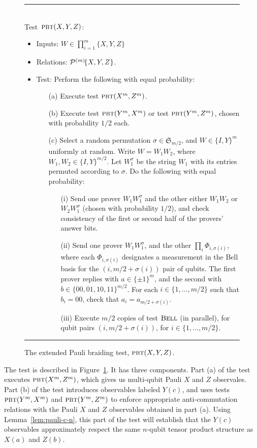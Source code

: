 \begin{figure}[H]
\rule[1ex]{16.5cm}{0.5pt}\\
\justifying
Test~$\textsc{pbt}(X,Y,Z)$: 
\begin{itemize}
\item Inputs: $W\in\prod_{i=1}^m\{X,Y,Z\}$
\item Relations: $\mathcal{P}^{(m)}\!\{X,Y,Z\}$.  
\item Test: Perform the following with equal probability: 
\begin{enumerate}
\item[(a)] Execute test $\textsc{pbt}(X^m,Z^m)$. 
\item[(b)] Execute test $\textsc{pbt}(Y^m,X^m)$ or test $\textsc{pbt}(Y^m,Z^m)$, chosen with probability $1/2$ each.
\item[(c)] Select a random permutation  $\sigma \in \mathfrak{S}_{m/2}$, and $W\in  \{I,Y\}^m$ uniformly at random. Write $W=W_1 W_2$, where $W_1,W_2\in \{I,Y\}^{m/2}$. Let $W_1^\sigma$ be the string $W_1$ with its entries permuted according to $\sigma$. Do the following with equal probability: 
\begin{enumerate}
\item[(i)] Send one prover $W_1 W_1^\sigma$ and the other either $W_1 W_2$ or $W_2W_1^\sigma$ (chosen with probability $1/2$), and check consistency of the first or second half of the provers' answer bits.
\item[(ii)] Send one prover $W_1  W_1^\sigma$, and the other $\prod_i \Phi_{i,\sigma(i)}$, where each $\Phi_{i,\sigma(i)}$ designates a measurement in the Bell basis for the $(i,m/2+\sigma(i))$ pair of qubits. 
    The first prover replies with $a\in\{\pm 1 \}^m$, and the second with $b\in \{00,01,10,11\}^{m/2}$. For each
    $i\in\{1,\ldots,m/2\}$ such that $b_i = 00$, check that $a_i  = a_{m/2+\sigma(i)}$. 
\item[(iii)] Execute $m/2$ copies of test $\textsc{Bell}$ (in parallel), for qubit pairs $(i,m/2+\sigma(i))$, for $i\in\{1,\ldots,m/2\}$. 
\end{enumerate}
\end{enumerate}
\end{itemize}
\rule[2ex]{16.5cm}{0.5pt}\vspace{-.5cm}
\caption{The extended Pauli braiding test, $\textsc{pbt}(X,Y,Z)$.}
\label{fig:e-pbt}
\end{figure}


The test is described in Figure~\ref{fig:e-pbt}. It has three components. Part (a) of the test executes $\textsc{pbt}(X^m,Z^m)$, which gives us multi-qubit Pauli $X$ and $Z$ observales. Part (b) of the test introduces observables labeled $Y(c)$, and uses tests $\textsc{pbt}(Y^m,X^m)$ and $\textsc{pbt}(Y^m,Z^m)$ to enforce appropriate anti-commutation relations with the Pauli $X$ and $Z$ observables obtained in part (a). Using Lemma~\ref{lem:pauli-c-n}, this part of the test will establish that the $Y(c)$ observables approximately respect the same $n$-qubit tensor product structure as $X(a)$ and $Z(b)$. 


